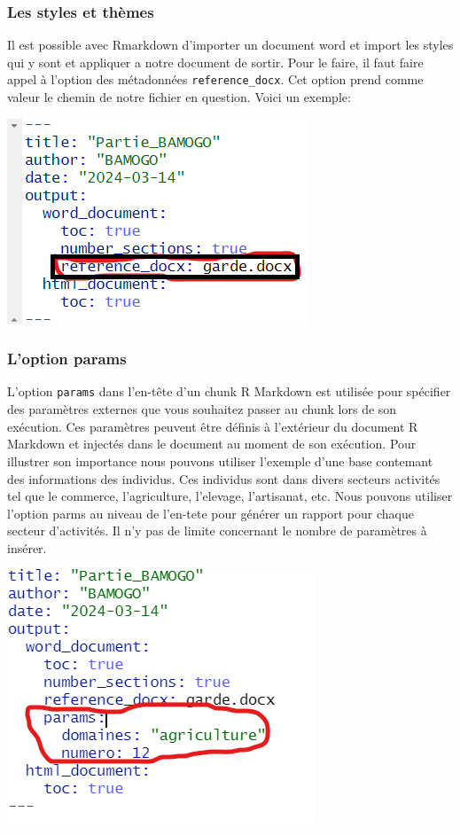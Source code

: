 \documentclass[
  12pt,
]{article}
\begin{document}
\subsubsection{Les styles et thèmes}\label{les-styles-et-thuxe8mes}

Il est possible avec Rmarkdown d'importer un document word et import les
styles qui y sont et appliquer a notre document de sortir. Pour le
faire, il faut faire appel à l'option des métadonnées
\texttt{reference\_docx}. Cet option prend comme valeur le chemin de
notre fichier en question. Voici un exemple:

\begin{center}\includegraphics[width=0.5\linewidth,height=0.5\textheight]{../Document_Rmarkdown/Images/Style} \end{center}

\subsubsection{L'option params}\label{loption-params}

L'option \texttt{params} dans l'en-tête d'un chunk R Markdown est
utilisée pour spécifier des paramètres externes que vous souhaitez
passer au chunk lors de son exécution. Ces paramètres peuvent être
définis à l'extérieur du document R Markdown et injectés dans le
document au moment de son exécution. Pour illustrer son importance nous
pouvons utiliser l'exemple d'une base contemant des informations des
individus. Ces individus sont dans divers secteurs activités tel que le
commerce, l'agriculture, l'elevage, l'artisanat, etc. Nous pouvons
utiliser l'option parms au niveau de l'en-tete pour générer un rapport
pour chaque secteur d'activités. Il n'y pas de limite concernant le
nombre de paramètres à insérer.

\begin{center}\includegraphics[width=0.5\linewidth,height=0.5\textheight]{../Document_Rmarkdown/Images/Params} \end{center}
\end{document}
